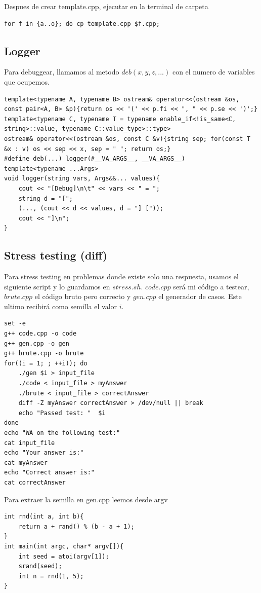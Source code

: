 \documentclass[10pt,spanish,mexico]{article}
\numberwithin{equation}{section}
\begin{document}
\begin{multicols}{2}
Despues de crear template.cpp, ejecutar en la terminal de carpeta
\begin{verbatim}
for f in {a..o}; do cp template.cpp $f.cpp;
\end{verbatim}

\vspace{-1.2\baselineskip}
\hrulefill
\subsection{Logger}
Para debuggear, llamamos al metodo $deb(x,y,z,...)$ con el numero de variables que ocupemos.
\begin{verbatim}
template<typename A, typename B> ostream& operator<<(ostream &os, const pair<A, B> &p){return os << '(' << p.fi << ", " << p.se << ')';}
template<typename C, typename T = typename enable_if<!is_same<C, string>::value, typename C::value_type>::type>
ostream& operator<<(ostream &os, const C &v){string sep; for(const T &x : v) os << sep << x, sep = " "; return os;}
#define deb(...) logger(#__VA_ARGS__, __VA_ARGS__)
template<typename ...Args>
void logger(string vars, Args&&... values){
    cout << "[Debug]\n\t" << vars << " = ";
    string d = "[";
    (..., (cout << d << values, d = "] ["));
    cout << "]\n";
}
\end{verbatim}

\vspace{-1.2\baselineskip}
\hrulefill
\subsection{Stress testing (diff)}
Para stress testing en problemas donde existe solo una respuesta, usamos el siguiente script y lo guardamos en $stress.sh$. $code.cpp$ será mi código a testear, $brute.cpp$ el código bruto pero correcto y $gen.cpp$ el generador de casos. Este ultimo recibirá como semilla el valor $i$.
\begin{verbatim}
set -e
g++ code.cpp -o code
g++ gen.cpp -o gen
g++ brute.cpp -o brute
for((i = 1; ; ++i)); do
    ./gen $i > input_file
    ./code < input_file > myAnswer
    ./brute < input_file > correctAnswer
    diff -Z myAnswer correctAnswer > /dev/null || break
    echo "Passed test: "  $i
done
echo "WA on the following test:"
cat input_file
echo "Your answer is:"
cat myAnswer
echo "Correct answer is:"
cat correctAnswer
\end{verbatim}

Para extraer la semilla en gen.cpp leemos desde argv
\begin{verbatim}
int rnd(int a, int b){
    return a + rand() % (b - a + 1);
}
int main(int argc, char* argv[]){
    int seed = atoi(argv[1]);
    srand(seed);
    int n = rnd(1, 5);
}
\end{verbatim}


\end{multicols}
\end{document}
